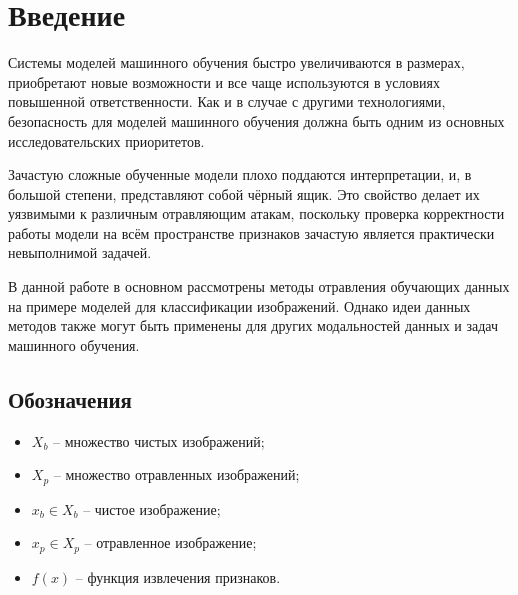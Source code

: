 \section*{Введение}
Системы моделей машинного обучения быстро увеличиваются в размерах, приобретают новые возможности и все чаще используются в условиях повышенной ответственности. Как и в случае с другими технологиями, безопасность для моделей машинного обучения должна быть одним из основных исследовательских приоритетов.~\cite{hendrycks_unsolved_2021}

Зачастую сложные обученные модели плохо поддаются интерпретации, и, в большой степени, представляют собой чёрный ящик.
Это свойство делает их уязвимыми к различным отравляющим атакам, поскольку проверка корректности работы модели на всём пространстве признаков зачастую является практически невыполнимой задачей.\cite{chen_detecting_2018}

В данной работе в основном рассмотрены методы отравления обучающих данных на примере моделей для классификации изображений. Однако идеи данных методов также могут быть применены для других модальностей данных и задач машинного обучения.


\subsection*{Обозначения}
\begin{itemize}
    \item ${X_b}$ – множество чистых изображений;
    \item ${X_p}$ – множество отравленных изображений;
    \item ${x_{b} \in X_b}$ – чистое изображение;
    \item ${x_{p} \in X_p}$ – отравленное изображение;
    \item $f(x)$ – функция извлечения признаков.
\end{itemize}
